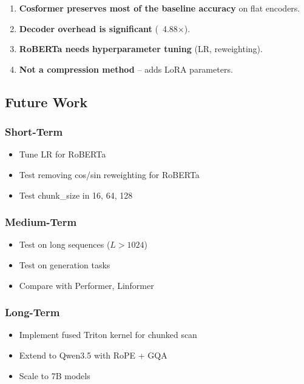 \begin{enumerate}
\item \textbf{Cosformer preserves most of the baseline accuracy} on flat encoders.
\item \textbf{Decoder overhead is significant} (~4.88$\times$).
\item \textbf{RoBERTa needs hyperparameter tuning} (LR, reweighting).
\item \textbf{Not a compression method} -- adds LoRA parameters.

\end{enumerate}
\subsection{Future Work}

\subsubsection{Short-Term}

\begin{itemize}
\item Tune LR for RoBERTa
\item Test removing cos/sin reweighting for RoBERTa
\item Test chunk\_size in {16, 64, 128}

\end{itemize}
\subsubsection{Medium-Term}

\begin{itemize}
\item Test on long sequences ($L > 1024$)
\item Test on generation tasks
\item Compare with Performer, Linformer

\end{itemize}
\subsubsection{Long-Term}

\begin{itemize}
\item Implement fused Triton kernel for chunked scan
\item Extend to Qwen3.5 with RoPE + GQA
\item Scale to 7B models

\end{itemize}
